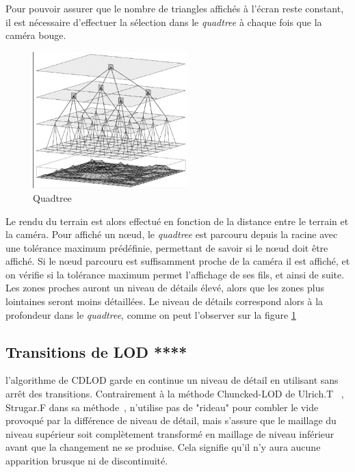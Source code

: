     Pour pouvoir assurer que le nombre de triangles affichés à l'écran reste constant, il est nécessaire d'effectuer la sélection dans le \emph{quadtree} à chaque fois que la caméra bouge.\\
    \vspace{0.5cm}
    \begin{figure}
 \includegraphics[width=6cm]{img/quadtree.png}
   \caption[Quadtree]{Quadtree\protect\footnotemark}
   \label{fig:quadtree-selection}
 \end{figure}
    Le rendu du terrain est alors effectué en fonction de la distance entre le terrain et la caméra. Pour affiché un n\oe{}ud, le \emph{quadtree} est parcouru depuis la racine avec une tolérance maximum prédéfinie, permettant de savoir si le n\oe{}ud doit être affiché. Si le n\oe{}ud parcouru est suffisamment proche de la caméra il est affiché, et on vérifie si la tolérance maximum permet l'affichage de ses fils, et ainsi de suite. Les zones proches auront un niveau de détails élevé, alors que les zones plus lointaines seront moins détaillées. Le niveau de détails correspond alors à la profondeur dans le \emph{quadtree}, comme on peut l'observer sur la figure \ref{fig:quadtree-selection}

\vspace{0.5cm}

\subsection{Transitions de LOD ****}
    l'algorithme de CDLOD garde en continue un niveau de détail en utilisant sans arrêt des transitions. Contrairement à la méthode Chuncked-LOD de Ulrich.T~\cite{CLOD} , Strugar.F dans sa méthode~\cite{CDLOD}, n'utilise pas de "rideau" pour combler le vide provoqué par la différence de niveau de détail, mais s'assure que le maillage du niveau supérieur soit complètement transformé en maillage de niveau inférieur avant que la changement ne se produise. Cela signifie qu'il n'y aura aucune apparition brusque ni de discontinuité.
    
